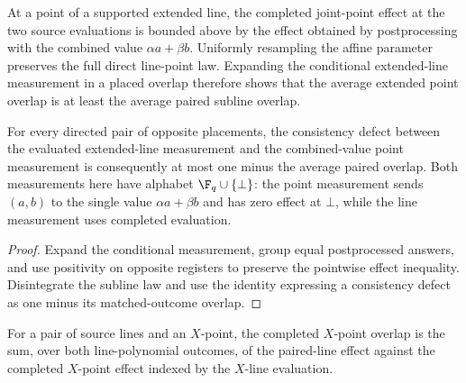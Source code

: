 \begin{lemma}
	\label{lem:qld-extended-line-overlap-comparison}
	\leanok
	At a point of a supported extended line, the completed joint-point effect at
	the two source evaluations is bounded above by the effect obtained by
	postprocessing with the combined value $\alpha a+\beta b$. Uniformly
	resampling the affine parameter preserves the full direct line-point law.
	Expanding the conditional extended-line measurement in a placed overlap
	therefore shows that the average extended point overlap is at least the
	average paired subline overlap.

	For every directed pair of opposite placements, the consistency defect
	between the evaluated extended-line measurement and the combined-value point
	measurement is consequently at most one minus the average paired overlap.
	Both measurements here have alphabet $\F_q\cup\{\bot\}$: the point
	measurement sends $(a,b)$ to the single value $\alpha a+\beta b$ and has
	zero effect at $\bot$, while the line measurement uses completed evaluation.
\end{lemma}
\begin{proof}
	\leanok
	Expand the conditional measurement, group equal postprocessed answers, and
	use positivity on opposite registers to preserve the pointwise effect
	inequality. Disintegrate the subline law and use the identity expressing a
	consistency defect as one minus its matched-outcome overlap.
\end{proof}

\begin{definition}
	\label{def:qld-x-point-overlap}
	\leanok
	For a pair of source lines and an $X$-point, the completed $X$-point overlap
	is the sum, over both line-polynomial outcomes, of the paired-line effect
	against the completed $X$-point effect indexed by the $X$-line evaluation.
\end{definition}

